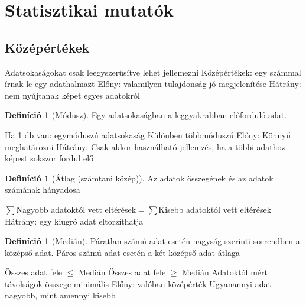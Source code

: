 \documentclass[twoside,12pt]{report}
\theoremstyle{definition}
\newtheorem{definition}[theorem]{Definíció}
\begin{document}
\section{Statisztikai mutatók}
	\subsection{Középértékek}
	\begin{outline}
		\1 Adatsokaságokat csak leegyszerűsítve lehet jellemezni
			\2 Középértékek: egy számmal írnak le egy adathalmazt
			\2 Előny: valamilyen tulajdonság jó megjelenítése
			\2 Hátrány: nem nyújtanak képet egyes adatokról
	\end{outline}
\pagebreak
	\begin{outline}
		\1[] \begin{definition}[Módusz]
				Egy adatsokaságban a leggyakrabban előforduló adat.
			\end{definition}
			\2 Ha 1 db van: egymóduszú adatsokaság
				\3 Különben többmóduszú
			\2 Előny: Könnyű meghatározni
			\2 Hátrány: Csak akkor használható jellemzés, ha a többi adathoz képest sokszor fordul elő
		\1[] \begin{definition}[Átlag (számtani közép)]
				Az adatok összegének és az adatok számának hányadosa
			\end{definition}
			\2 $\sum$Nagyobb adatoktól vett eltérések$=\sum$Kisebb adatoktól vett eltérések
			\2 Hátrány: egy kiugró adat eltorzíthatja
		\1[] \begin{definition}[Medián]
			Páratlan számú adat esetén nagyság szerinti sorrendben a középső adat. Páros számú adat esetén a két középső adat átlaga
		\end{definition}
			\2 Összes adat fele $\le$ Medián
			\2 Összes adat fele $\ge$ Medián
			\2 Adatoktól mért távolságok összege minimális
			\2 Előny: valóban középérték
				\3 Ugyanannyi adat nagyobb, mint amennyi kisebb
	\end{outline}
\end{document}

